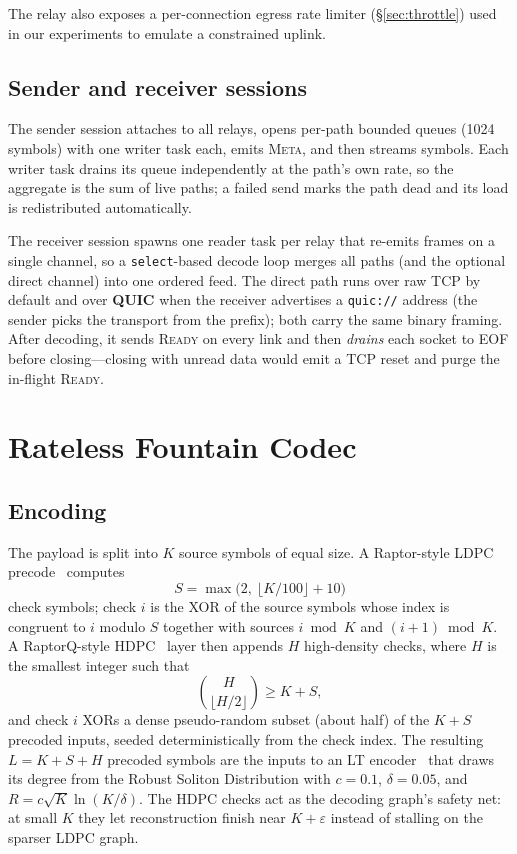 \documentclass[conference]{IEEEtran}
\begin{document}
The relay also exposes a per-connection egress rate limiter
(\S\ref{sec:throttle}) used in our experiments to emulate a constrained uplink.

\subsection{Sender and receiver sessions}
The sender session attaches to all relays, opens per-path bounded queues
(1024 symbols) with one writer task each, emits \textsc{Meta}, and then streams
symbols. Each writer task drains its queue independently at the path's own
rate, so the aggregate is the sum of live paths; a failed send marks the path
dead and its load is redistributed automatically.

The receiver session spawns one reader task per relay that re-emits frames on
a single channel, so a \texttt{select}-based decode loop merges all paths (and
the optional direct channel) into one ordered feed. The direct path runs over
raw TCP by default and over \textbf{QUIC} when the receiver advertises a
\texttt{quic://} address (the sender picks the transport from the prefix);
both carry the same binary framing. After decoding, it sends \textsc{Ready} on
every link and then \emph{drains} each socket to EOF before closing---closing
with unread data would emit a TCP reset and purge the in-flight
\textsc{Ready}.

\section{Rateless Fountain Codec}
\label{sec:codec}

\subsection{Encoding}
The payload is split into $K$ source symbols of equal size. A Raptor-style
LDPC precode~\cite{shokrollahi2006raptor,rfc5053} computes
\begin{equation}
S = \max\!\bigl(2,\ \lfloor K/100\rfloor + 10\bigr)
\end{equation}
check symbols; check $i$ is the XOR of the source symbols whose index is
congruent to $i$ modulo $S$ together with sources $i\bmod K$ and $(i{+}1)\bmod K$.
A RaptorQ-style HDPC~\cite{rfc6330} layer then appends $H$ high-density checks,
where $H$ is the smallest integer such that
\begin{equation}
\binom{H}{\lfloor H/2\rfloor} \ge K + S,
\end{equation}
and check $i$ XORs a dense pseudo-random subset (about half) of the $K+S$
precoded inputs, seeded deterministically from the check index. The resulting
$L=K+S+H$ precoded symbols are the inputs to an LT encoder~\cite{luby2002lt}
that draws its degree from the Robust Soliton Distribution with
$c=0.1$, $\delta=0.05$, and $R=c\sqrt{K}\ln(K/\delta)$. The HDPC checks act as
the decoding graph's safety net: at small $K$ they let reconstruction finish
near $K+\varepsilon$ instead of stalling on the sparser LDPC graph.
\end{document}
